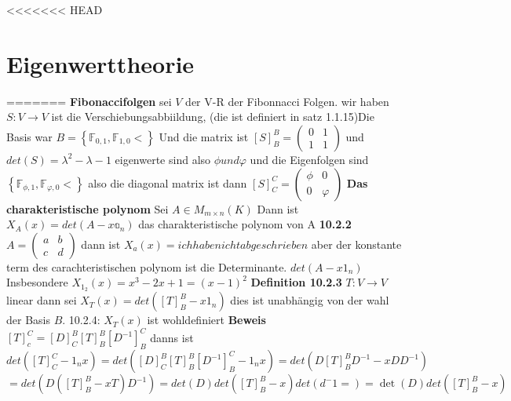\documentclass{article}
\begin{document}
<<<<<<< HEAD
\section{Eigenwerttheorie}
=======
\textbf{Fibonaccifolgen} sei $V$ der V-R der Fibonnacci Folgen. wir haben $S:V\rightarrow V$ ist die Verschiebungsabbiildung, (die ist definiert in satz 1.1.15)\newline Die Basis war $B=\left\lbrace\mathbb{F}_{0,1}, \mathbb{F}_{1,0}<\right\rbrace$
Und die matrix ist $[S]^B_B=\begin{pmatrix}0&1\\1&1\end{pmatrix}$ und $det(S)=\lambda^2-\lambda-1$ eigenwerte sind also $\phi und \varphi$ und die Eigenfolgen sind $\left\lbrace\mathbb{F}_{\phi,1}, \mathbb{F}_{\varphi,0}<\right\rbrace$ also die diagonal matrix ist dann $[S]^C_C=\begin{pmatrix}\phi&0\\0&\varphi\end{pmatrix}$
\textbf{Das charakteristische polynom} Sei $A\in M_{m\times n}(K)$ Dann ist $X_A(x)=det(A-x\mathbb{a}_n)$ das charakteristische polynom von A\newline
\textbf{10.2.2} $A=\begin{pmatrix}a&b\\c&d\end{pmatrix}$ dann ist $X_a(x)=ichhabe nicht abgeschrieben$ aber der konstante term des carachteristischen polynom ist die Determinante.\newline
\textbf{}$det(A-x1_n)$ Insbesondere $X_{1_2}(x)=x^3-2x+1=(x-1)^2$ 
\newline
\textbf{Definition 10.2.3} $T:V\rightarrow V$ linear dann sei $X_T(x)=det([T]_B^B-x1_n)$ dies ist unabhängig von der wahl der Basis $B$. 10.2.4: $X_T(x)$ ist wohldefiniert
\newline
\textbf{Beweis} $[T]_c^C=[D]^B_C[T]_B^B[D^{-1}]^C_B$ danns ist \[det([T]_C^C-1_nx) =det([D]^B_C[T]_B^B[D^{-1}]^C_B-1_nx)=det(D[T]^B_BD^{-1}-xDD^{-1})\]\[=det(D([T]^B_B-xT)D^{-1})=det(D)det([T]^B_B-x)det(d^-1=)=\det(D)det([T]^B_B-x)\]
\end{document}
